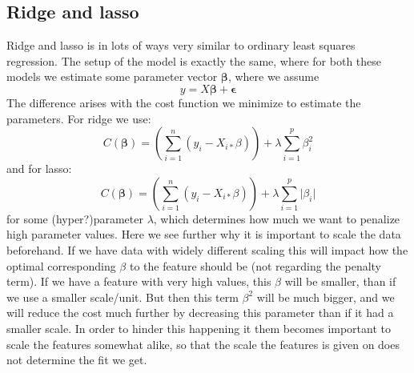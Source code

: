 \documentclass{article}
\begin{document}
\subsection{Ridge and lasso}
Ridge and lasso is in lots of ways very similar to ordinary least squares
regression. The setup of the model is exactly the same, where for both these
models we estimate some parameter vector $\mathbf{\beta}$, where we assume
$$y = X \mathbf{\beta} + \mathbf{\epsilon}$$
The difference arises with the cost function we minimize to estimate the parameters. For ridge we use:
$$C(\mathbf{\beta}) = \left(\sum_{i=1}^{n} (y_i - X_{i *} \beta)\right) + \lambda \sum_{i=1}^p \beta_i^2$$
and for lasso:
$$C(\mathbf{\beta}) = \left(\sum_{i=1}^{n} (y_i - X_{i *} \beta)\right) + \lambda \sum_{i=1}^p \lvert \beta_i \rvert$$
for some (hyper?)parameter $\lambda$, which determines how much we want to
penalize high parameter values. Here we see further why it is important to scale
the data beforehand. If we have data with widely different scaling this will
impact how the optimal corresponding $\beta$ to the feature should be (not
regarding the penalty term). If we have a feature with very high values, this
$\beta$ will be smaller, than if we use a smaller scale/unit. But then this term
$\beta^2$ will be much bigger, and we will reduce the cost much further by
decreasing this parameter than if it had a smaller scale. In order to hinder
this happening it them becomes important to scale the features somewhat alike,
so that the scale the features is given on does not determine the fit we get.
\end{document}
